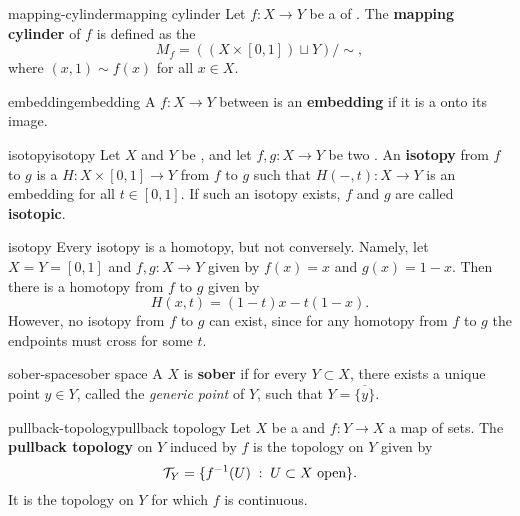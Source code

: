 \begin{topic}{mapping-cylinder}{mapping cylinder}
    Let $f : X \to Y$ be a  of . The \textbf{mapping cylinder} of $f$ is defined as the 
    \[ M_f = ( (X \times [0, 1]) \sqcup Y ) / \sim{} , \]
    where $(x, 1) \sim f(x)$ for all $x \in X$.
\end{topic}

\begin{topic}{embedding}{embedding}
    A  $f : X \to Y$ between  is an \textbf{embedding} if it is a  onto its image.
\end{topic}

\begin{topic}{isotopy}{isotopy}
    Let $X$ and $Y$ be , and let $f, g : X \to Y$ be two . An \textbf{isotopy} from $f$ to $g$ is a  $H : X \times [0, 1] \to Y$ from $f$ to $g$ such that $H(-, t) : X \to Y$ is an embedding for all $t \in [0, 1]$. If such an isotopy exists, $f$ and $g$ are called \textbf{isotopic}.
\end{topic}

\begin{example}{isotopy}
    Every isotopy is a homotopy, but not conversely. Namely, let $X = Y = [0, 1]$ and $f, g : X \to Y$ given by $f(x) = x$ and $g(x) = 1 - x$. Then there is a homotopy from $f$ to $g$ given by
    \[ H(x, t) = (1 - t) x - t (1 - x) . \]
    However, no isotopy from $f$ to $g$ can exist, since for any homotopy from $f$ to $g$ the endpoints must cross for some $t$.
\end{example}

\begin{topic}{sober-space}{sober space}
    A  $X$ is \textbf{sober} if for every  $Y \subset X$, there exists a unique point $y \in Y$, called the \textit{generic point} of $Y$, such that $Y = \overline{\{ y \}}$.
\end{topic}

\begin{topic}{pullback-topology}{pullback topology}
    Let $X$ be a  and $f : Y \to X$ a map of sets. The \textbf{pullback topology} on $Y$ induced by $f$ is the topology on $Y$ given by
    \[ \mathcal{T}_Y = \{ f^{-1}(U) \;:\; U \subset X \textup{ open} \} . \]
    It is the  topology on $Y$ for which $f$ is continuous.
\end{topic}

